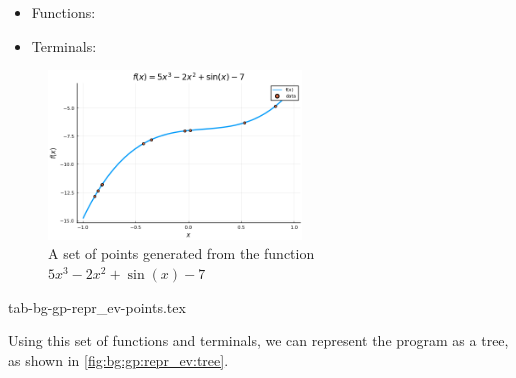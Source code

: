   \begin{itemize}
    \item Functions:
    \item Terminals:
  \end{itemize}

  \begin{figure}[ht!]
    \centering
    \includegraphics[width=0.6\textwidth]{img/theoretical_framework/symbolic.png}
    \caption{
      A set of points generated from the function \(5x^3 - 2x^2 + \sin(x) - 7\)
    }
    \label{fig:bg:gp:repr_ev:points}
  \end{figure}

  {tab-bg-gp-repr_ev-points.tex}

  Using this set of functions and terminals, we can represent the program as a
  tree, as shown in \vref{fig:bg:gp:repr_ev:tree}.

